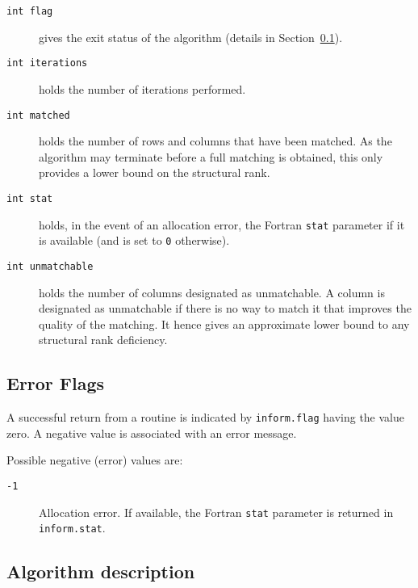 \begin{description}

\item[\texttt{int flag}] gives the exit status of the algorithm (details in Section~\ref{returns:auction}).

\item[\texttt{int iterations}] holds the number of iterations performed.

\item[\texttt{int matched}] holds the number of rows and columns that have been matched. As the algorithm may terminate before a full matching is obtained, this only provides a lower bound on the structural rank.

\item[\texttt{int stat}] holds, in the event of an allocation error, the Fortran \texttt{stat} parameter if it is available (and is set to \texttt{0} otherwise).

\item[\texttt{int unmatchable}] holds the number of columns designated as unmatchable. A column is designated as unmatchable if there is no way to match it that improves the quality of the matching. It hence gives an approximate lower bound to any structural rank deficiency.

\end{description}

\subsection{Error Flags} \label{returns:auction}
A successful return from a routine is indicated by \texttt{inform.flag} having the value zero. A negative value is associated with an error message.

Possible negative (error) values are:
\begin{description}
\item[\texttt{-1}] Allocation error. If available, the Fortran \texttt{stat} parameter is returned in \texttt{inform.stat}.
\end{description}

\subsection{Algorithm description} \label{method:auction}

